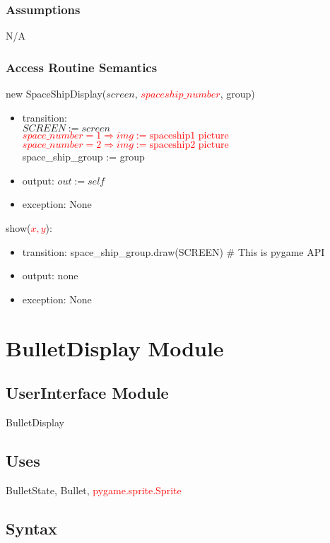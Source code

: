 \documentclass[12pt]{article}
\begin{document}
\subsubsection*{Assumptions}
N/A
\subsubsection*{Access Routine Semantics}
new SpaceShipDisplay($screen$, \textcolor{red}{\st{$spaceship\_number$}}, group)
\begin{itemize}
    \item transition: \\$SCREEN := screen$
    \\\textcolor{red}{\st{$space\_number = 1 \Rightarrow img := \text{spaceship1 picture}$}}
    \\\textcolor{red}{\st{$space\_number = 2 \Rightarrow img := \text{spaceship2 picture}$}}\\
    space\_ship\_group := group
    \item output: $out := self$
    \item exception: None
\end{itemize}

\noindent show(\textcolor{red}{\st{$x, y$}}):
\begin{itemize}
    \item transition: space\_ship\_group.draw(SCREEN) \# This is pygame API
    \item output: none
    \item exception: None
\end{itemize}
\newpage

\section{BulletDisplay Module}

\subsection*{UserInterface Module}
BulletDisplay
\subsection*{Uses}
BulletState, Bullet, \textcolor{red}{pygame.sprite.Sprite}

\subsection*{Syntax}
\end{document}
